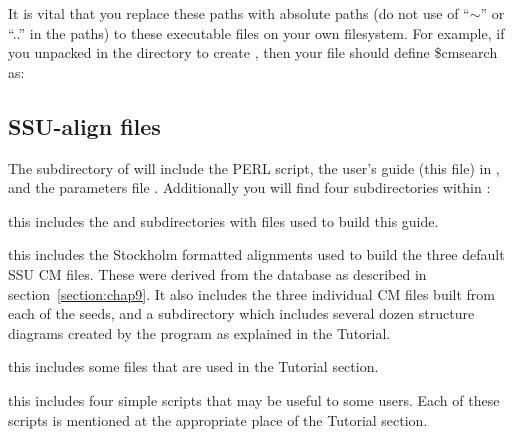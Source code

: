 It is vital that you replace these paths with absolute paths (do not 
use of ``$\sim$'' or ``..'' in the paths) to these executable files on your own
filesystem. For example, if you unpacked  in the 
directory  to create
, then your  file
should define \$cmsearch as: 


\subsection{SSU-align files}
The  subdirectory of  will include
the  PERL script, the user's guide (this file) in
, and the parameters file 
. 
Additionally you will find four subdirectories
within :

\begin{wideitem}

\item[\emprog{documentation}] this includes the  and
   subdirectories with files used to build this
  guide.

\item[\emprog{seeds}] this includes the Stockholm formatted alignments
  used to build the three default SSU CM files. These were derived
  from the  database \cite{CannoneGutell02} as described in
  section~\ref{section:chap9}. It also includes the three individual CM
  files built from each of the seeds, and a subdirectory
   which includes several dozen structure diagrams
  created by the  program as explained in the Tutorial.

\item[\emprog{tutorial}] this includes some files that are used in the
  Tutorial section.

\item[\emprog{scripts}] this includes four simple 
  scripts that may be useful to some users. Each of these scripts is
  mentioned at the appropriate place of the Tutorial section.

\end{wideitem}
